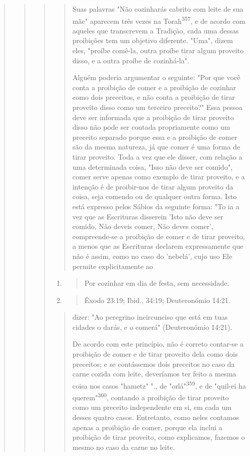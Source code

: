 \begin{quote}
\begin{quote}
\begin{quote}
\begin{quote}
Suas palavras "Não cozinharás cabrito com leite de sua mãe" apare­cem
três vezes na Torah\textsuperscript{357}, e de acordo com aqueles que
transcrevem a Tra­diçào, cada uma dessas proibições tem um objetivo
diferente. "Uma", dizem eles, "proíbe comê-la, outra proíbe tirar algum
proveito disso, e a outra proíbe de cozinhá-la".

Alguém poderia argumentar o seguinte: "Por que você conta a proi­bição
de comer e a proibição de cozinhar como dois preceitos, e não conta a
proibição de tirar proveito disso como um terceiro preceito?" Essa
pessoa deve ser informada que a proibição de tirar proveito disso não
pode ser con­tada propriamente como um preceito separado porque essa e a
proibição de comer são da mesma natureza, já que comer é uma forma de
tirar proveito. Toda a vez que ele disser, com relação a uma determinada
coisa, "Isso não deve ser comido", comer serve apenas como exemplo de
tirar proveito, e a intenção é de proibir-nos de tirar algum proveito da
coisa, seja comendo ou de qualquer outra forma. Isto está expresso pelos
Sábios da seguinte for­ma: "To ia a vez que as Escrituras disserein
'Isto não deve ser comido, Não deveis comer, Não deves comer',
compreende-se a proibição de comer e de tirar proveito, a menos que as
Escrituras declarem expressamente que não é assim, como no caso do
'nebelá', cujo uso Ele permite explicitamente ao
\end{quote}

\begin{enumerate}
\def\labelenumi{\arabic{enumi}.}
\setcounter{enumi}{355}
\item
 \begin{quote}
 Por cozinhar em dia de festa, sem necessidade.
 \end{quote}
\item
 \begin{quote}
 Êxodo 23:19; Ibid., 34:19; Deuteronómio 14:21.
 \end{quote}
\end{enumerate}

\begin{quote}

dizer: "Ao peregrino incircunciso que está em tuas cidades o darás, e o
come­rá" (Deuteronómio 14:21).

De acordo com este princípio, não é correto contar-se a proibição de
comer e de tirar proveito dela como dois preceitos; e se contássemos
dois preceitos no caso da carne cozida com leite, deveríamos ter feito a
mesma coi­sa nos casos "hametz" "., de
"orlá"\textsuperscript{359}, e de "quil-ei ha
querem"\textsuperscript{360}, contan­do a proibição de tirar proveito
como um preceito independente em si, em ca­da um desses quatro casos.
Entretanto, como neles contamos apenas a proibi­ção de comer, porque ela
inclui a proibição de tirar proveito, como explica­mos, fazemos o mesmo
no caso da carne no leite.


\end{quote}
\end{quote}
\end{quote}
\end{quote}
